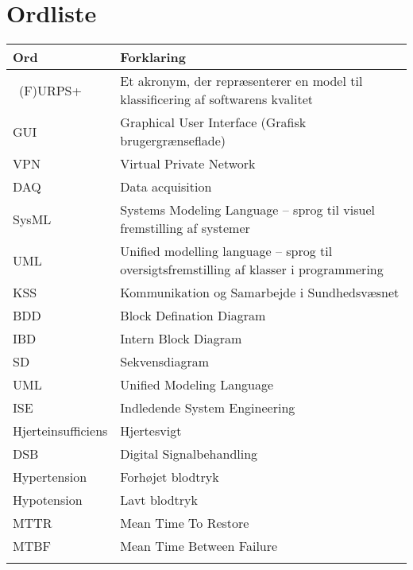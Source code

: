\chapter{Ordliste}

\begin{longtabu} to 
    Ord &    Forklaring\\
    \toprule\
(F)URPS+ 	&    Et akronym, der repræsenterer en model til klassificering af softwarens kvalitet \\
    GUI		&	Graphical User Interface (Grafisk brugergrænseflade)\\
    VPN		&	Virtual Private Network\\
    DAQ		&	Data acquisition \\
    SysML	&   Systems Modeling Language – sprog til visuel fremstilling af systemer \\
    UML		& Unified modelling language – sprog til oversigtsfremstilling af klasser i programmering \\
    KSS		&	Kommunikation og Samarbejde i Sundhedsvæsnet \\
    BDD 	&	Block Defination Diagram \\
	IBD		& 	Intern Block Diagram \\
	SD		& 	Sekvensdiagram \\
	UML		& 	Unified Modeling Language \\
	ISE 	&	Indledende System Engineering \\
	Hjerteinsufficiens &  Hjertesvigt \\
	DSB		&	Digital Signalbehandling \\
	Hypertension &  Forhøjet blodtryk \\
	Hypotension & Lavt blodtryk \\
	MTTR	&	Mean Time To Restore \\
	MTBF	&	Mean Time Between Failure \\
 
\label{forkort}
\end{longtabu}